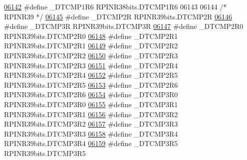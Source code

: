 \begin{DoxyCode}
\hypertarget{a00015_source_l06142}{}\hyperlink{a00015_a85c02708ed7aea8b18ad48ced7119c7e}{06142} \textcolor{preprocessor}{#define \_DTCMP1R6 RPINR38bits.DTCMP1R6}
06143 
06144 \textcolor{comment}{/* RPINR39 */}
\hypertarget{a00015_source_l06145}{}\hyperlink{a00015_abf4ddf38f361369065e1a7c2a2249b88}{06145} \textcolor{preprocessor}{#define \_DTCMP2R RPINR39bits.DTCMP2R}
\hypertarget{a00015_source_l06146}{}\hyperlink{a00015_ae1fca6ff210576b064e192b44a67b58f}{06146} \textcolor{preprocessor}{#define \_DTCMP3R RPINR39bits.DTCMP3R}
\hypertarget{a00015_source_l06147}{}\hyperlink{a00015_a2419cc0ce09311f6ce944ead78e2d6ac}{06147} \textcolor{preprocessor}{#define \_DTCMP2R0 RPINR39bits.DTCMP2R0}
\hypertarget{a00015_source_l06148}{}\hyperlink{a00015_a6d44d57831c926526ff5bb8f54c1d809}{06148} \textcolor{preprocessor}{#define \_DTCMP2R1 RPINR39bits.DTCMP2R1}
\hypertarget{a00015_source_l06149}{}\hyperlink{a00015_a4ef6402109846d1217ddc941f459c81c}{06149} \textcolor{preprocessor}{#define \_DTCMP2R2 RPINR39bits.DTCMP2R2}
\hypertarget{a00015_source_l06150}{}\hyperlink{a00015_ab7769feccd2440416945ab13f53d543f}{06150} \textcolor{preprocessor}{#define \_DTCMP2R3 RPINR39bits.DTCMP2R3}
\hypertarget{a00015_source_l06151}{}\hyperlink{a00015_ae90b7f8ab40564d4935fa89eb7dc3abc}{06151} \textcolor{preprocessor}{#define \_DTCMP2R4 RPINR39bits.DTCMP2R4}
\hypertarget{a00015_source_l06152}{}\hyperlink{a00015_af023b175fd3e46220e57f5acc9666c83}{06152} \textcolor{preprocessor}{#define \_DTCMP2R5 RPINR39bits.DTCMP2R5}
\hypertarget{a00015_source_l06153}{}\hyperlink{a00015_af6fe47daa8e7ecfb1420e0ef95c45e5d}{06153} \textcolor{preprocessor}{#define \_DTCMP2R6 RPINR39bits.DTCMP2R6}
\hypertarget{a00015_source_l06154}{}\hyperlink{a00015_a841f0ed8d060db59bf6991cf1ae99d61}{06154} \textcolor{preprocessor}{#define \_DTCMP3R0 RPINR39bits.DTCMP3R0}
\hypertarget{a00015_source_l06155}{}\hyperlink{a00015_a8c386e64e0dbf04f9723cb28bf9c6dec}{06155} \textcolor{preprocessor}{#define \_DTCMP3R1 RPINR39bits.DTCMP3R1}
\hypertarget{a00015_source_l06156}{}\hyperlink{a00015_ae9eb3830f44749c83cbe1fe742649ea9}{06156} \textcolor{preprocessor}{#define \_DTCMP3R2 RPINR39bits.DTCMP3R2}
\hypertarget{a00015_source_l06157}{}\hyperlink{a00015_afff9a4b9df40cad3fa8e099d0b8ff748}{06157} \textcolor{preprocessor}{#define \_DTCMP3R3 RPINR39bits.DTCMP3R3}
\hypertarget{a00015_source_l06158}{}\hyperlink{a00015_ab1b004a0379be0e98e6cab437e748ca1}{06158} \textcolor{preprocessor}{#define \_DTCMP3R4 RPINR39bits.DTCMP3R4}
\hypertarget{a00015_source_l06159}{}\hyperlink{a00015_ad555ca2099adfc3bf4c1635e64cc90d8}{06159} \textcolor{preprocessor}{#define \_DTCMP3R5 RPINR39bits.DTCMP3R5}

\end{DoxyCode}
